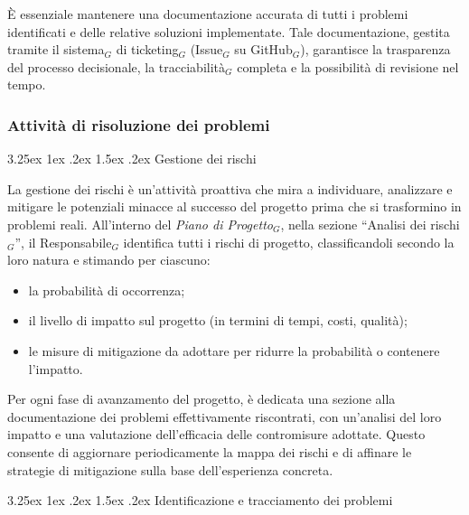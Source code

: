 \documentclass[a4paper, 10pt]{article}
\makeatletter
\renewcommand\paragraph{\@startsection{paragraph}{4}{\z@}%
  {3.25ex \@plus1ex \@minus .2ex}%
  {1.5ex \@plus .2ex}%
  {\normalfont\normalsize\bfseries}}
\makeatother
\begin{document}
È essenziale mantenere una documentazione accurata di tutti i problemi identificati e delle relative soluzioni implementate. Tale documentazione, gestita tramite il sistema$_G$ di ticketing$_G$ (Issue$_G$ su GitHub$_G$), garantisce la trasparenza del processo decisionale, la tracciabilità$_G$ completa e la possibilità di revisione nel tempo.

\subsubsection{Attività di risoluzione dei problemi}
\label{subsubsec:attivita_risoluzione}

\paragraph{Gestione dei rischi}

La gestione dei rischi è un'attività proattiva che mira a individuare, analizzare e mitigare le potenziali minacce al successo del progetto prima che si trasformino in problemi reali. All'interno del \emph{Piano di Progetto}$_G$, nella sezione ``Analisi dei rischi$_G$'', il Responsabile$_G$ identifica tutti i rischi di progetto, classificandoli secondo la loro natura e stimando per ciascuno:
\begin{itemize}
    \item la probabilità di occorrenza;
    \item il livello di impatto sul progetto (in termini di tempi, costi, qualità);
    \item le misure di mitigazione da adottare per ridurre la probabilità o contenere l'impatto.
\end{itemize}

Per ogni fase di avanzamento del progetto, è dedicata una sezione alla documentazione dei problemi effettivamente riscontrati, con un'analisi del loro impatto e una valutazione dell'efficacia delle contromisure adottate. Questo consente di aggiornare periodicamente la mappa dei rischi e di affinare le strategie di mitigazione sulla base dell'esperienza concreta.

\paragraph{Identificazione e tracciamento dei problemi}
\end{document}
